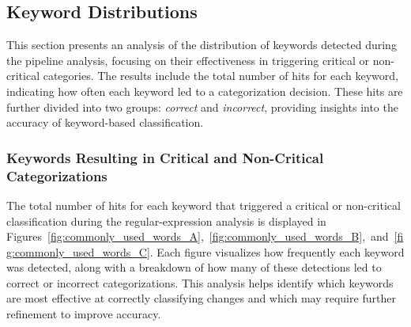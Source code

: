 \subsection{Keyword Distributions}

This section presents an analysis of the distribution of keywords detected during the pipeline analysis, focusing on their effectiveness in triggering critical or non-critical categories. The results include the total number of hits for each keyword, indicating how often each keyword led to a categorization decision. These hits are further divided into two groups: \textit{correct} and \textit{incorrect}, providing insights into the accuracy of keyword-based classification.

\subsubsection{Keywords Resulting in Critical and Non-Critical Categorizations}

The total number of hits for each keyword that triggered a critical or non-critical classification during the regular-expression analysis is displayed in Figures~\ref{fig:commonly_used_words_A},~\ref{fig:commonly_used_words_B},~and~\ref{fig:commonly_used_words_C}. Each figure visualizes how frequently each keyword was detected, along with a breakdown of how many of these detections led to correct or incorrect categorizations. This analysis helps identify which keywords are most effective at correctly classifying changes and which may require further refinement to improve accuracy.


